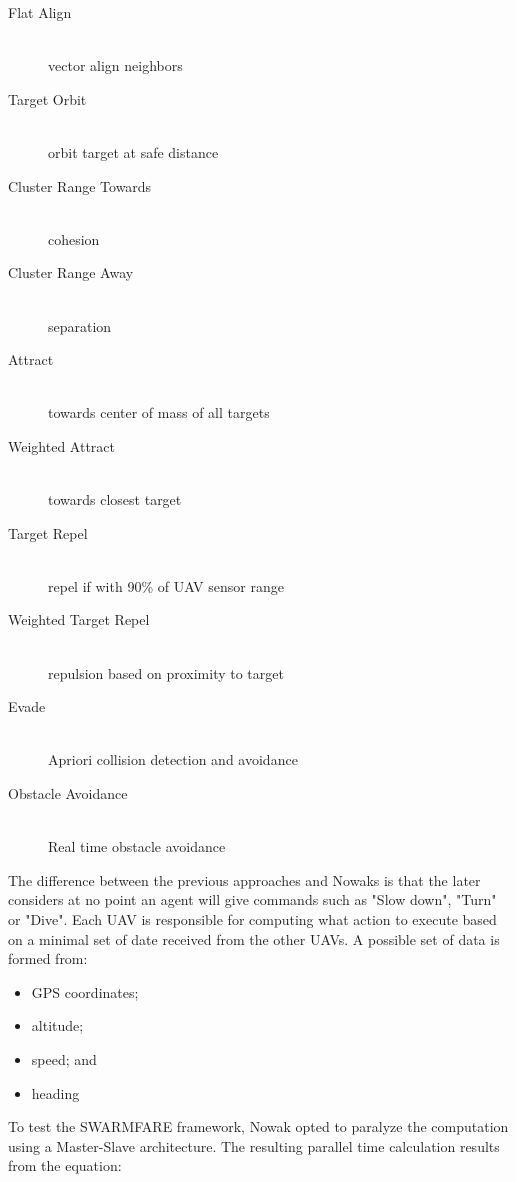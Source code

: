 \begin{description}
\item [Flat Align] \hfill \\ vector align neighbors
\item [Target Orbit] \hfill \\ orbit target at safe distance
\item [Cluster Range Towards] \hfill \\ cohesion
\item [Cluster Range Away] \hfill \\ separation
\item [Attract] \hfill \\ towards center of mass of all targets
\item [Weighted Attract] \hfill \\ towards closest target
\item [Target Repel] \hfill \\ repel if with 90\% of UAV sensor range
\item [Weighted Target Repel] \hfill \\ repulsion based on proximity to target
\item [Evade] \hfill \\ Apriori collision detection and avoidance
\item [Obstacle Avoidance] \hfill \\ Real time obstacle avoidance
\end{description}

The difference between the previous approaches and Nowaks is that the later
considers at no point an agent will give commands such as "Slow down", "Turn" or
"Dive". Each UAV is responsible for computing what action to execute based on 
a minimal set of date received from the other UAVs. A possible set of data
is formed from:
\begin{itemize}
\item GPS coordinates;
\item altitude;
\item speed; and
\item heading
\end{itemize}

To test the SWARMFARE framework, Nowak opted to paralyze the computation
using a Master-Slave architecture. The resulting parallel time calculation
results from the equation:

